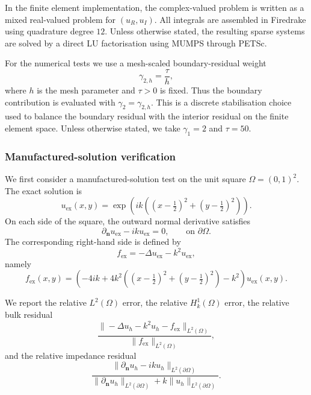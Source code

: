 \documentclass[twoside,11pt]{article}
\newcommand{\qp}[1]{\ensuremath{\!\left({#1}\right)}}
\begin{document}
{In the finite element implementation, the complex-valued problem is written as a mixed real-valued problem for $(u_R,u_I)$. All integrals are assembled in Firedrake using quadrature degree $12$. Unless otherwise stated, the resulting sparse systems are solved by a direct LU factorisation using MUMPS through PETSc.

For the numerical tests we use a mesh-scaled boundary-residual weight
\begin{equation}
\gamma_{2,h}=\frac{\tau}{h},
\end{equation}
where $h$ is the mesh parameter and $\tau>0$ is fixed. Thus the boundary contribution is evaluated with $\gamma_2=\gamma_{2,h}$. This is a discrete stabilisation choice used to balance the boundary residual with the interior residual on the finite element space. Unless otherwise stated, we take $\gamma_1=2$ and $\tau=50$.

\subsubsection*{Manufactured-solution verification}

We first consider a manufactured-solution test on the unit square $\Omega=(0,1)^2$. The exact solution is
\begin{equation}
u_{\mathrm{ex}}(x,y)
=
\exp\qp{
ik\qp{(x-\tfrac12)^2+(y-\tfrac12)^2}
}.
\end{equation}
On each side of the square, the outward normal derivative satisfies
\begin{equation}
\partial_{\mathbf n}u_{\mathrm{ex}}-iku_{\mathrm{ex}}=0,
\qquad
\text{on } \partial\Omega.
\end{equation}
The corresponding right-hand side is defined by
\[
f_{\mathrm{ex}}=-\Delta u_{\mathrm{ex}}-k^2u_{\mathrm{ex}},
\]
namely
\begin{equation}
f_{\mathrm{ex}}(x,y)
=
\qp{
-4ik
+4k^2\qp{(x-\tfrac12)^2+(y-\tfrac12)^2}
-k^2
}
u_{\mathrm{ex}}(x,y).
\end{equation}

We report the relative $L^2(\Omega)$ error, the relative
$H^1_k(\Omega)$ error, the relative bulk residual
\begin{equation}
\frac{
\|-\Delta u_h-k^2u_h-f_{\mathrm{ex}}\|_{L^2(\Omega)}
}{
\|f_{\mathrm{ex}}\|_{L^2(\Omega)}
},
\end{equation}
and the relative impedance residual
\begin{equation}
\frac{
\|\partial_{\mathbf n}u_h-iku_h\|_{L^2(\partial\Omega)}
}{
\|\partial_{\mathbf n}u_h\|_{L^2(\partial\Omega)}
+k\|u_h\|_{L^2(\partial\Omega)}
}.
\end{equation}

}
\end{document}
